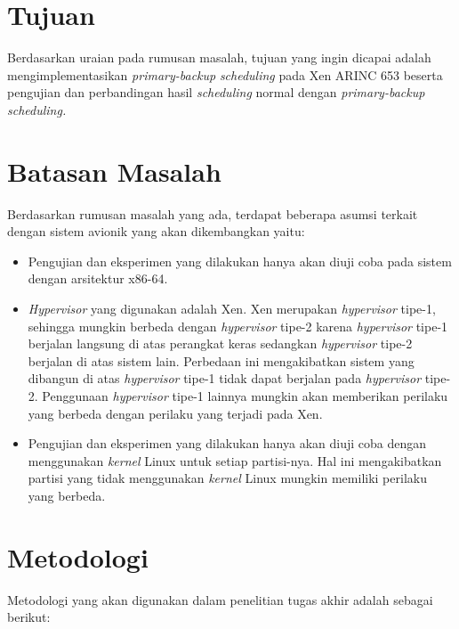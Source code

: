 \section{Tujuan}

Berdasarkan uraian pada rumusan masalah, tujuan yang ingin dicapai adalah mengimplementasikan \textit{primary-backup} \textit{scheduling} pada Xen ARINC 653 beserta pengujian dan perbandingan hasil \textit{scheduling} normal dengan \textit{primary-backup scheduling.}


\section{Batasan Masalah}
\label{section:batasan_masalah}

Berdasarkan rumusan masalah yang ada, terdapat beberapa asumsi terkait dengan sistem avionik yang akan dikembangkan yaitu:

\begin{itemize}

    \item Pengujian dan eksperimen yang dilakukan hanya akan diuji coba pada sistem dengan arsitektur x86-64.
    \item \textit{Hypervisor} yang digunakan adalah Xen.
        Xen merupakan \textit{hypervisor} tipe-1, sehingga mungkin berbeda dengan \textit{hypervisor} tipe-2 karena \textit{hypervisor} tipe-1 berjalan langsung di atas perangkat keras sedangkan \textit{hypervisor} tipe-2 berjalan di atas sistem lain.
        Perbedaan ini mengakibatkan sistem yang dibangun di atas \textit{hypervisor} tipe-1 tidak dapat berjalan pada \textit{hypervisor} tipe-2.
        Penggunaan \textit{hypervisor} tipe-1 lainnya mungkin akan memberikan perilaku yang berbeda dengan perilaku yang terjadi pada Xen.
    \item Pengujian dan eksperimen yang dilakukan hanya akan diuji coba dengan menggunakan \textit{kernel} Linux untuk setiap partisi-nya.
        Hal ini mengakibatkan partisi yang tidak menggunakan \textit{kernel} Linux mungkin memiliki perilaku yang berbeda.

\end{itemize}

\section{Metodologi}

Metodologi yang akan digunakan dalam penelitian tugas akhir adalah sebagai berikut:

